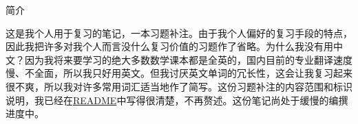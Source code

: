 \documentclass[a4paper, 11pt, UTF8]{article}
\def\BulletPoint{{\small$\bullet$}}
\def\OR{\large O{\footnotesize R.}}
\def\Solution{{\timesbfx\large S\footnotesize{OLUTION:}}\,\,\,}
\def\dbsp{$\bullet$}
\begin{document}
\begin{large}
\newcommand{\ExampleX}[1]{
	{\timesbfx E\footnotesize{XAMPLE:}} #1\vspace{-16pt}\par
	\Solution
}

\newcommand{\ExampleXnosolus}[1]{
	{\timesbfx E\footnotesize{XAMPLE:}} #1\vspace{-16pt}\par
}

\newcommand{\ProblemN}[2]{
	\Onumber{#1} #2\vspace{-16pt}\par
	\Solution
}

\newcommand{\ProblemNnosolus}[2]{
	\Onumber{#1} #2\vspace{-16pt}\par
}

\newcommand{\ProblemB}[1]{
	\BulletPoint #1\vspace{-16pt}\par
	\Solution
}


\newcommand{\ProblemBnosolus}[1]{
	\BulletPoint #1\vspace{-16pt}\par
}

\newcommand{\ProblemBc}[1]{
	$\circ$#1\vspace{-16pt}\par
	\Solution
}

\newcommand{\ProblemBnoor}[2]{
	\BulletPoint\,\hspace{0.5pt}\dbsp #1#2\vspace{-16pt}\par
	\Solution
}

\newcommand{\ProblemBor}[2]{
	\BulletPoint\,\hspace{0.5pt}\dbsp{\OR} (#1) #2\vspace{-16pt}\par
	\Solution
}

\newcommand{\AlignEq}[2]{
\vspace{-25pt}
\begin{align*}
	#1#2
\end{align*}
\vspace{-25pt}
}

\newcommand{\ChapterDecl}[3]{{\huge\timesbfxx\hypertarget{#1}{#2}}#3\vspace{5pt}}

\centerline{\Large 简介}\vspace{4pt}\par
{\normalsize 这是我个人用于复习的笔记，一本习题补注。由于我个人偏好的复习手段的特点，因此我把许多对我个人而言没什么复习价值的习题作了省略。为什么我没有用中文？因为我将来要学习的绝大多数数学课本都是全英的，国内目前的专业翻译速度慢、不全面，所以我只好用英文。但我讨厌英文单词的冗长性，这会让我复习起来很不爽，所以我对许多常用词汇适当地作了简写。这份习题补注的内容范围和标识说明，我已经在\href{run:./README}{README}中写得很清楚，不再赘述。这份笔记尚处于缓慢的编撰进度中。}\par



\end{large}
\end{document}
